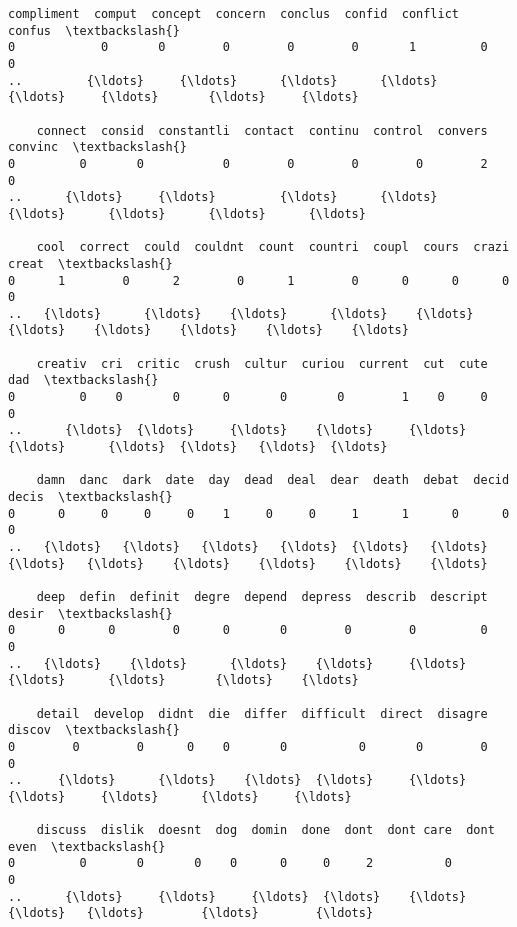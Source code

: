 \documentclass[11pt]{article}
\begin{document}
\begin{Verbatim}[commandchars=\\\{\}]
    compliment  comput  concept  concern  conclus  confid  conflict  confus  \textbackslash{}
0            0       0        0        0        0       1         0       0   
..         {\ldots}     {\ldots}      {\ldots}      {\ldots}      {\ldots}     {\ldots}       {\ldots}     {\ldots}   

    connect  consid  constantli  contact  continu  control  convers  convinc  \textbackslash{}
0         0       0           0        0        0        0        2        0   
..      {\ldots}     {\ldots}         {\ldots}      {\ldots}      {\ldots}      {\ldots}      {\ldots}      {\ldots}   

    cool  correct  could  couldnt  count  countri  coupl  cours  crazi  creat  \textbackslash{}
0      1        0      2        0      1        0      0      0      0      0   
..   {\ldots}      {\ldots}    {\ldots}      {\ldots}    {\ldots}      {\ldots}    {\ldots}    {\ldots}    {\ldots}    {\ldots}   

    creativ  cri  critic  crush  cultur  curiou  current  cut  cute  dad  \textbackslash{}
0         0    0       0      0       0       0        1    0     0    0   
..      {\ldots}  {\ldots}     {\ldots}    {\ldots}     {\ldots}     {\ldots}      {\ldots}  {\ldots}   {\ldots}  {\ldots}   

    damn  danc  dark  date  day  dead  deal  dear  death  debat  decid  decis  \textbackslash{}
0      0     0     0     0    1     0     0     1      1      0      0      0   
..   {\ldots}   {\ldots}   {\ldots}   {\ldots}  {\ldots}   {\ldots}   {\ldots}   {\ldots}    {\ldots}    {\ldots}    {\ldots}    {\ldots}   

    deep  defin  definit  degre  depend  depress  describ  descript  desir  \textbackslash{}
0      0      0        0      0       0        0        0         0      0   
..   {\ldots}    {\ldots}      {\ldots}    {\ldots}     {\ldots}      {\ldots}      {\ldots}       {\ldots}    {\ldots}   

    detail  develop  didnt  die  differ  difficult  direct  disagre  discov  \textbackslash{}
0        0        0      0    0       0          0       0        0       0   
..     {\ldots}      {\ldots}    {\ldots}  {\ldots}     {\ldots}        {\ldots}     {\ldots}      {\ldots}     {\ldots}   

    discuss  dislik  doesnt  dog  domin  done  dont  dont care  dont even  \textbackslash{}
0         0       0       0    0      0     0     2          0          0   
..      {\ldots}     {\ldots}     {\ldots}  {\ldots}    {\ldots}   {\ldots}   {\ldots}        {\ldots}        {\ldots}   


\end{Verbatim}
\end{document}
